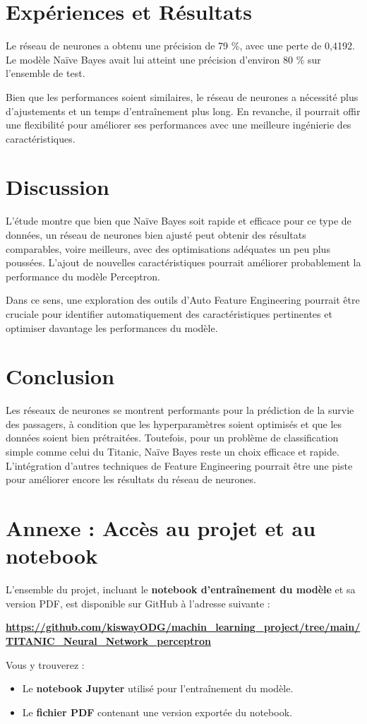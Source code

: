 \documentclass{rapportECL}
\begin{document}
\section{Expériences et Résultats}
Le réseau de neurones a obtenu une précision de 79 \%, avec une perte de 0,4192. Le modèle Naïve Bayes avait lui atteint une précision d’environ 80 \% sur l’ensemble de test.

Bien que les performances soient similaires, le réseau de neurones a nécessité plus d’ajustements et un temps d'entraînement plus long. En revanche, il pourrait offir une flexibilité  pour améliorer ses performances avec  une meilleure ingénierie des caractéristiques.

\section{Discussion}
L’étude montre que bien que Naïve Bayes soit rapide et efficace pour ce type de données, un réseau de neurones bien ajusté peut obtenir des résultats comparables, voire meilleurs, avec des optimisations adéquates un peu plus poussées. L’ajout de nouvelles caractéristiques pourrait améliorer probablement la performance du modèle Perceptron.

Dans ce sens, une exploration des outils d’Auto Feature Engineering pourrait être cruciale pour identifier automatiquement des caractéristiques pertinentes et optimiser davantage les performances du modèle.
\section{Conclusion}
Les réseaux de neurones se montrent performants pour la prédiction de la survie des passagers, à condition que les hyperparamètres soient optimisés et que les données soient bien prétraitées. Toutefois, pour un problème de classification simple comme celui du Titanic, Naïve Bayes reste un choix efficace et rapide. L'intégration d'autres techniques de Feature Engineering pourrait être une piste pour améliorer encore les résultats du réseau de neurones.



\newpage

\section*{Annexe : Accès au projet et au notebook}

L’ensemble du projet, incluant le \textbf{notebook d'entraînement du modèle} et sa version PDF, est disponible sur GitHub à l’adresse suivante :  

\begin{center}  
\textbf{\url{https://github.com/kiswayODG/machin_learning_project/tree/main/TITANIC_Neural_Network_perceptron}}  
\end{center}  

Vous y trouverez :  
\begin{itemize}  
    \item Le \textbf{notebook Jupyter} utilisé pour l'entraînement du modèle.  
    \item Le \textbf{fichier PDF} contenant une version exportée du notebook.  
\end{itemize}  
\end{document}
